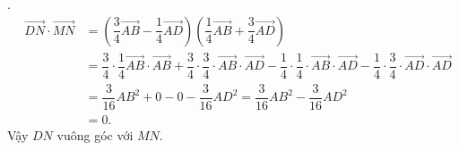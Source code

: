\begin{ex}
{\begin{itemchoice}
.
\begin{eqnarray*}
&\overrightarrow{DN}\cdot\overrightarrow{MN}& =\left(\dfrac{3}{4}\overrightarrow {AB}-\dfrac{1}{4}\overrightarrow{AD}\right)\left(\dfrac{1}{4}\overrightarrow {AB}+\dfrac{3}{4}\overrightarrow{AD}\right)\\
&& =\dfrac{3}{4}\cdot \dfrac{1}{4} \overrightarrow {AB} \cdot \overrightarrow {AB} + \dfrac{3}{4}\cdot \dfrac{3}{4}\cdot \overrightarrow {AB} \cdot \overrightarrow {AD} - \dfrac{1}{4} \cdot \dfrac{1}{4} \cdot \overrightarrow {AB} \cdot \overrightarrow {AD} - \dfrac{1}{4} \cdot \dfrac{3}{4} \cdot \overrightarrow {AD} \cdot \overrightarrow {AD}\\
&&=\dfrac{3}{16}AB^2+0-0-\dfrac{3}{16}AD^2=\dfrac{3}{16}AB^2-\dfrac{3}{16}AD^2\\
&&=0.
\end{eqnarray*}
Vậy $DN$ vuông góc với $MN$.
\end{itemchoice}
}
\end{ex}


